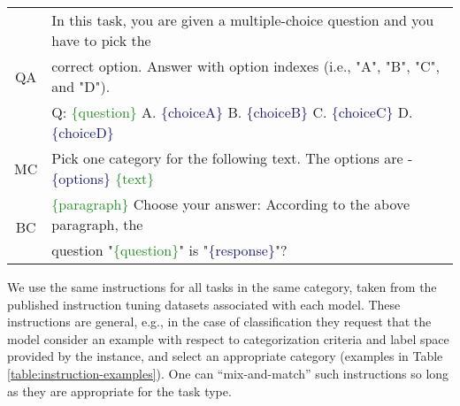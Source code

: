 \begin{table*}[h]
  \small
  \centering
  \begin{tabular}{c l}
    \toprule
    \multirow{3}{*}{\textsc{QA}} & In this task, you are given a multiple-choice question and you have to pick the                                                                                                                              \\
                                 & correct option. Answer with option indexes (i.e., "A", "B", "C", and "D").                                                                                                                                   \\
                                 & Q: \textcolor{ForestGreen}{\{question\}} A. \textcolor{MidnightBlue}{\{choiceA\}} B. \textcolor{MidnightBlue}{\{choiceB\}} C. \textcolor{MidnightBlue}{\{choiceC\}} D. \textcolor{MidnightBlue}{\{choiceD\}} \\
    \midrule
    \multirow{1}{*}{\textsc{MC}} & Pick one category for the following text. The options are - \textcolor{MidnightBlue}{\{options\}} \textcolor{ForestGreen}{\{text\}}                                                                          %
    \\
    \midrule
    \multirow{2}{*}{\textsc{BC}} & \textcolor{ForestGreen}{\{paragraph\}} Choose your answer: According to the above paragraph, the                                                                                                             \\
                                 & question "\textcolor{ForestGreen}{\{question\}}" is "\textcolor{MidnightBlue}{\{response\}}"?                                                                                                                \\
    \bottomrule
  \end{tabular}
  \caption{Examples of observed instructions we collected for three general types of tasks.}
  \label{table:instruction-examples}
\end{table*}

We use the same instructions for all tasks in the same category, taken from the published instruction tuning datasets associated with each model.
These instructions are general, e.g., in the case of classification they request that the model consider an example with respect to categorization criteria and label space provided by the instance, and select an appropriate category (examples in Table \ref{table:instruction-examples}).
One can ``mix-and-match'' such instructions so long as they are appropriate for the task type.


